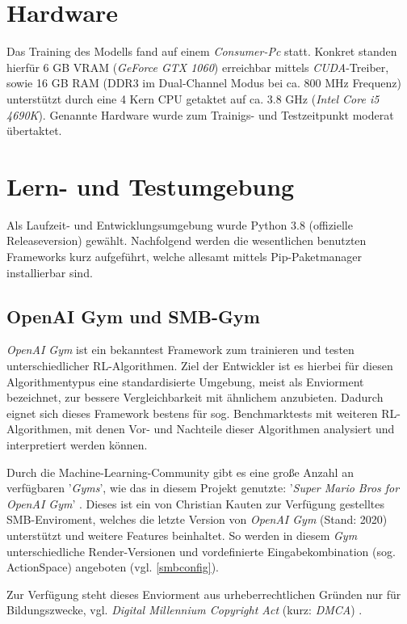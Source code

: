 \documentclass[sigconf,nonacm]{acmart}
\begin{document}
\section{Hardware}
\label{hardware}
Das Training des Modells fand auf einem \textit{Consumer-Pc} statt. Konkret standen hierfür 6 GB VRAM (\textit{GeForce GTX 1060}) erreichbar mittels \textit{CUDA}-Treiber, sowie 16 GB RAM (DDR3 im Dual-Channel Modus bei ca. 800 MHz Frequenz) unterstützt durch eine 4 Kern CPU getaktet auf ca. 3.8 GHz (\textit{Intel Core i5 4690K}). Genannte Hardware wurde zum Trainigs- und Testzeitpunkt moderat übertaktet.

\section{Lern- und Testumgebung}
Als Laufzeit- und Entwicklungsumgebung wurde Python 3.8 (offizielle Releaseversion) gewählt. Nachfolgend werden die wesentlichen benutzten Frameworks kurz aufgeführt, welche allesamt mittels Pip-Paketmanager installierbar sind.

\subsection{OpenAI Gym und SMB-Gym}
\label{smbgym}
\textit{OpenAI Gym} \cite{Brockman2016OpenAIG} ist ein bekanntest Framework zum trainieren und testen unterschiedlicher RL-Algorithmen. Ziel der Entwickler ist es hierbei für diesen Algorithmentypus eine standardisierte Umgebung, meist als Enviorment bezeichnet, zur bessere Vergleichbarkeit mit ähnlichem anzubieten. Dadurch eignet sich dieses Framework bestens für sog. Benchmarktests mit weiteren RL-Algorithmen, mit denen Vor- und Nachteile dieser Algorithmen analysiert und interpretiert werden können.

Durch die Machine-Learning-Community gibt es eine große Anzahl an verfügbaren '\textit{Gyms}', wie das in diesem Projekt genutzte: '\textit{Super Mario Bros for OpenAI Gym}' \cite{gym-smb}. Dieses ist ein von Christian Kauten zur Verfügung gestelltes SMB-Enviroment, welches die letzte Version von \textit{OpenAI Gym} (Stand: 2020) unterstützt und weitere Features beinhaltet. So werden in diesem \textit{Gym} unterschiedliche Render-Versionen und vordefinierte Eingabekombination (sog. ActionSpace) angeboten (vgl. \ref{smbconfig}).

Zur Verfügung steht dieses Enviorment aus urheberrechtlichen Gründen nur für Bildungszwecke, vgl. \textit{Digital Millennium Copyright Act} (kurz: \textit{DMCA}) \cite{dmca}.
\end{document}
